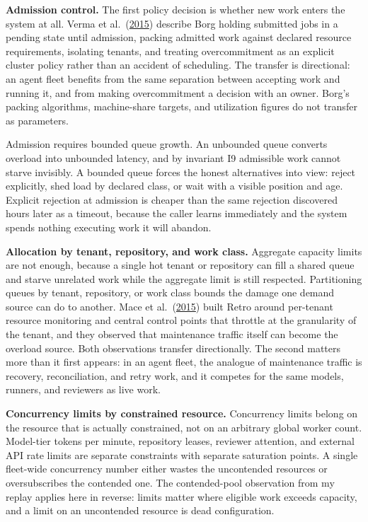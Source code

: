 \textbf{Admission control.} The first policy decision is whether new work enters the system at all. Verma et al.~(\href{https://research.google/pubs/large-scale-cluster-management-at-google-with-borg/}{2015}) describe Borg holding submitted jobs in a pending state until admission, packing admitted work against declared resource requirements, isolating tenants, and treating overcommitment as an explicit cluster policy rather than an accident of scheduling. The transfer is directional: an agent fleet benefits from the same separation between accepting work and running it, and from making overcommitment a decision with an owner. Borg's packing algorithms, machine-share targets, and utilization figures do not transfer as parameters.

Admission requires bounded queue growth. An unbounded queue converts overload into unbounded latency, and by invariant I9 admissible work cannot starve invisibly. A bounded queue forces the honest alternatives into view: reject explicitly, shed load by declared class, or wait with a visible position and age. Explicit rejection at admission is cheaper than the same rejection discovered hours later as a timeout, because the caller learns immediately and the system spends nothing executing work it will abandon.

\textbf{Allocation by tenant, repository, and work class.} Aggregate capacity limits are not enough, because a single hot tenant or repository can fill a shared queue and starve unrelated work while the aggregate limit is still respected. Partitioning queues by tenant, repository, or work class bounds the damage one demand source can do to another. Mace et al.~(\href{https://www.usenix.org/conference/nsdi15/technical-sessions/presentation/mace}{2015}) built Retro around per-tenant resource monitoring and central control points that throttle at the granularity of the tenant, and they observed that maintenance traffic itself can become the overload source. Both observations transfer directionally. The second matters more than it first appears: in an agent fleet, the analogue of maintenance traffic is recovery, reconciliation, and retry work, and it competes for the same models, runners, and reviewers as live work.

\textbf{Concurrency limits by constrained resource.} Concurrency limits belong on the resource that is actually constrained, not on an arbitrary global worker count. Model-tier tokens per minute, repository leases, reviewer attention, and external API rate limits are separate constraints with separate saturation points. A single fleet-wide concurrency number either wastes the uncontended resources or oversubscribes the contended one. The contended-pool observation from my replay applies here in reverse: limits matter where eligible work exceeds capacity, and a limit on an uncontended resource is dead configuration.

